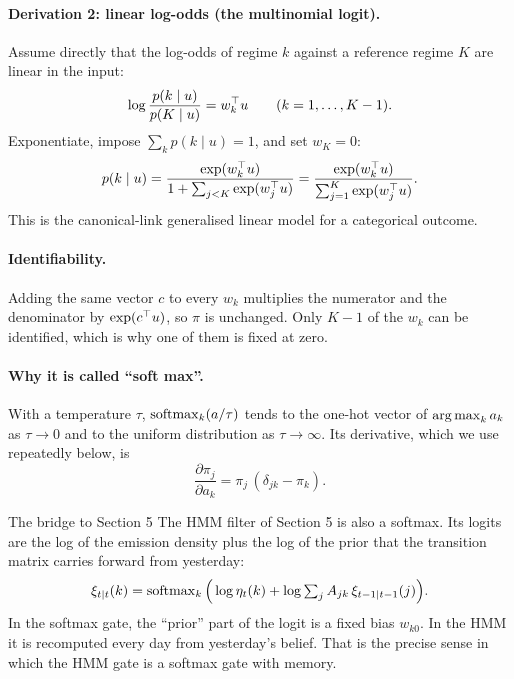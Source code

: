 \paragraph{Derivation 2: linear log-odds (the multinomial logit).} Assume directly that the log-odds of regime $k$ against a reference regime $K$ are linear in the input:
\begin{equation}
\log\frac{p(k\mid u)}{p(K\mid u)}=w_k^{\top} u\qquad(k=1,\dots,K-1).
\end{equation}
Exponentiate, impose $\sum_k p(k\mid u)=1$, and set $w_K=0$:
\begin{equation}
p(k\mid u)=\frac{\exp(w_k^{\top} u)}{1+\sum_{j<K}\exp(w_j^{\top} u)}=\frac{\exp(w_k^{\top} u)}{\sum_{j=1}^K\exp(w_j^{\top} u)}.
\end{equation}
This is the canonical-link generalised linear model for a categorical outcome.

\paragraph{Identifiability.} Adding the same vector $c$ to every $w_k$ multiplies the numerator and the denominator by $\exp(c^{\top} u)$, so $\pi$ is unchanged. Only $K-1$ of the $w_k$ can be identified, which is why one of them is fixed at zero.

\paragraph{Why it is called ``soft max''.} With a temperature $\tau$, $\operatorname{softmax}_k(a/\tau)$ tends to the one-hot vector of $\operatorname*{arg\,max}_k a_k$ as $\tau\to0$ and to the uniform distribution as $\tau\to\infty$. Its derivative, which we use repeatedly below, is
\begin{equation}\label{eq:softmax-deriv}
\frac{\partial\pi_j}{\partial a_k}=\pi_j\,(\delta_{jk}-\pi_k).
\end{equation}

\begin{keybox}{The bridge to Section 5}
The HMM filter of Section 5 is also a softmax. Its logits are the log of the emission density plus the log of the prior that the transition matrix carries forward from yesterday:
\[
\xi_{t\mid t}(k)=\operatorname{softmax}_k\Big(\log\eta_t(k)+\log\textstyle\sum_jA_{jk}\,\xi_{t-1\mid t-1}(j)\Big).
\]
In the softmax gate, the ``prior'' part of the logit is a fixed bias $w_{k0}$. In the HMM it is recomputed every day from yesterday's belief. That is the precise sense in which the HMM gate is a softmax gate with memory.
\end{keybox}

